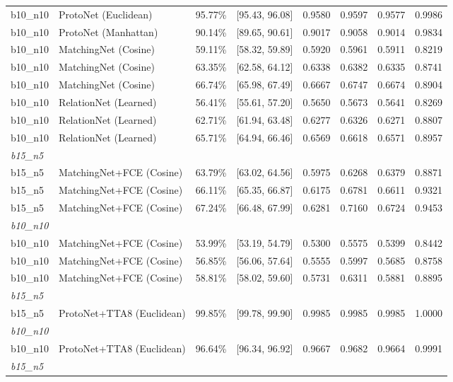 \begin{table}[htbp]
\begin{tabular}{lllccccc}
b10\_n10 & ProtoNet (Euclidean) & 95.77\% & [95.43, 96.08] & 0.9580 & 0.9597 & 0.9577 & 0.9986 \\
b10\_n10 & ProtoNet (Manhattan) & 90.14\% & [89.65, 90.61] & 0.9017 & 0.9058 & 0.9014 & 0.9834 \\
b10\_n10 & MatchingNet (Cosine) & 59.11\% & [58.32, 59.89] & 0.5920 & 0.5961 & 0.5911 & 0.8219 \\
b10\_n10 & MatchingNet (Cosine) & 63.35\% & [62.58, 64.12] & 0.6338 & 0.6382 & 0.6335 & 0.8741 \\
b10\_n10 & MatchingNet (Cosine) & 66.74\% & [65.98, 67.49] & 0.6667 & 0.6747 & 0.6674 & 0.8904 \\
b10\_n10 & RelationNet (Learned) & 56.41\% & [55.61, 57.20] & 0.5650 & 0.5673 & 0.5641 & 0.8269 \\
b10\_n10 & RelationNet (Learned) & 62.71\% & [61.94, 63.48] & 0.6277 & 0.6326 & 0.6271 & 0.8807 \\
b10\_n10 & RelationNet (Learned) & 65.71\% & [64.94, 66.46] & 0.6569 & 0.6618 & 0.6571 & 0.8957 \\
\hline
\multicolumn{8}{l}{\textit{b15\_n5}} \\
b15\_n5 & MatchingNet+FCE (Cosine) & 63.79\% & [63.02, 64.56] & 0.5975 & 0.6268 & 0.6379 & 0.8871 \\
b15\_n5 & MatchingNet+FCE (Cosine) & 66.11\% & [65.35, 66.87] & 0.6175 & 0.6781 & 0.6611 & 0.9321 \\
b15\_n5 & MatchingNet+FCE (Cosine) & 67.24\% & [66.48, 67.99] & 0.6281 & 0.7160 & 0.6724 & 0.9453 \\
\hline
\multicolumn{8}{l}{\textit{b10\_n10}} \\
b10\_n10 & MatchingNet+FCE (Cosine) & 53.99\% & [53.19, 54.79] & 0.5300 & 0.5575 & 0.5399 & 0.8442 \\
b10\_n10 & MatchingNet+FCE (Cosine) & 56.85\% & [56.06, 57.64] & 0.5555 & 0.5997 & 0.5685 & 0.8758 \\
b10\_n10 & MatchingNet+FCE (Cosine) & 58.81\% & [58.02, 59.60] & 0.5731 & 0.6311 & 0.5881 & 0.8895 \\
\hline
\multicolumn{8}{l}{\textit{b15\_n5}} \\
b15\_n5 & ProtoNet+TTA8 (Euclidean) & 99.85\% & [99.78, 99.90] & 0.9985 & 0.9985 & 0.9985 & 1.0000 \\
\hline
\multicolumn{8}{l}{\textit{b10\_n10}} \\
b10\_n10 & ProtoNet+TTA8 (Euclidean) & 96.64\% & [96.34, 96.92] & 0.9667 & 0.9682 & 0.9664 & 0.9991 \\
\hline
\multicolumn{8}{l}{\textit{b15\_n5}} \\

\end{tabular}
\end{table}

